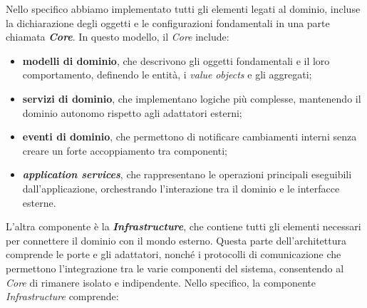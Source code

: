        \vspace{0.2 em}
        \noindent Nello specifico abbiamo implementato tutti gli elementi legati al dominio, incluse la dichiarazione degli oggetti e le configurazioni fondamentali in una parte chiamata \textbf{\textit{Core}}. In questo modello, il \textit{Core} include:

        \begin{itemize}
            \item \textbf{modelli di dominio}, che descrivono gli oggetti fondamentali e il loro comportamento, definendo le entità, i \textit{value} \textit{objects} e gli aggregati;
            \item \textbf{servizi di dominio}, che implementano logiche più complesse, mantenendo il dominio autonomo rispetto agli adattatori esterni;
            \item \textbf{eventi di dominio}, che permettono di notificare cambiamenti interni senza creare un forte accoppiamento tra componenti;
            \item \textbf{\textit{application services}}, che rappresentano le operazioni principali eseguibili dall'applicazione, orchestrando l'interazione tra il dominio e le interfacce esterne.
        \end{itemize}

        \vspace{0.2 em}
        \noindent L'altra componente è la \textit{\textbf{Infrastructure}}, che contiene tutti gli elementi necessari per connettere il dominio con il mondo esterno. Questa parte dell'architettura comprende le porte e gli adattatori, nonché i protocolli di comunicazione che permettono l'integrazione tra le varie componenti del sistema, consentendo al \textit{Core} di rimanere isolato e indipendente. Nello specifico, la componente \textit{Infrastructure} comprende:

